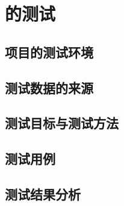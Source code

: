 \chapter{\app 的测试}\label{ch:test}


\section{项目的测试环境}\label{sec:test-env}



\section{测试数据的来源}\label{sec:test-data}



\section{测试目标与测试方法}\label{sec:test-target}



\section{测试用例}\label{sec:test-case}



\section{测试结果分析}\label{sec:test-result}

